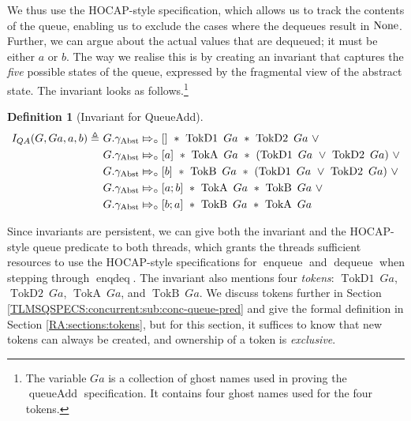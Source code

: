 \documentclass[a4paper, 10pt]{report}
\theoremstyle{definition}
\newtheorem{definition}{Definition}[section]
\newcommand{\enqueue}{\operatorname{enqueue}}
\newcommand{\dequeue}{\operatorname{dequeue}}
\newcommand{\enqdeq}{\operatorname{enqdeq}}
\newcommand{\queueAdd}{\operatorname{queueAdd}}
\newcommand{\QueueAddInvariant}{I_{QA}}
\newcommand{\Qg}{G}
\newcommand{\QAg}{Ga}
\newcommand{\gabst}{\gname_{\mathrm{Abst}}}
\newcommand{\TokDo}[1]{\operatorname{TokD1} ~ #1}
\newcommand{\TokDoQAg}{\TokDo{\QAg}}
\newcommand{\TokDt}[1]{\operatorname{TokD2} ~ #1}
\newcommand{\TokDtQAg}{\TokDt{\QAg}}
\newcommand{\TokA}[1]{\operatorname{TokA} ~ #1}
\newcommand{\TokAQAg}{\TokA{\QAg}}
\newcommand{\TokB}[1]{\operatorname{TokB} ~ #1}
\newcommand{\TokBQAg}{\TokB{\QAg}}
\newcommand{\abstractstatefullfrag}[2]{#1 \Mapsto_{\circ} #2}
\begin{document}
We thus use the HOCAP-style specification, which allows us to track the contents of the queue, enabling us to exclude the cases where the dequeues result in $\operatorname{None}$. Further, we can argue about the actual values that are dequeued; it must be either $a$ or $b$. The way we realise this is by creating an invariant that captures the \textit{five} possible states of the queue, expressed by the fragmental view of the abstract state. The invariant looks as follows.\footnote{The variable $\QAg$ is a collection of ghost names used in proving the $\queueAdd$ specification. It contains four ghost names used for the four tokens.}
\begin{definition}[Invariant for QueueAdd]\label{QueueSpecs:queueadd:invariant}
  \begin{align*}
    \QueueAddInvariant(\Qg, \QAg, a, b) \eqdef~
    &\abstractstatefullfrag{\Qg.\gabst}{[]}~\star~\TokDoQAg~\star~\TokDtQAg~\lor\\
    &\abstractstatefullfrag{\Qg.\gabst}{[a]}~\star~\TokAQAg~\star~(\TokDoQAg~\lor~\TokDtQAg)~\lor\\
    &\abstractstatefullfrag{\Qg.\gabst}{[b]}~\star~\TokBQAg~\star~(\TokDoQAg~\lor~\TokDtQAg)~\lor\\
    &\abstractstatefullfrag{\Qg.\gabst}{[a; b]}~\star~\TokAQAg~\star~\TokBQAg~\lor\\
    &\abstractstatefullfrag{\Qg.\gabst}{[b; a]}~\star~\TokBQAg~\star~\TokAQAg~
  \end{align*}
\end{definition}
Since invariants are persistent, we can give both the invariant and the HOCAP-style queue predicate to both threads, which grants the threads sufficient resources to use the HOCAP-style specifications for $\enqueue$ and $\dequeue$ when stepping through $\enqdeq$. The invariant also mentions four \textit{tokens}: $\TokDoQAg$, $\TokDtQAg$, $\TokAQAg$, and $\TokBQAg$. We discuss tokens further in Section \ref{TLMSQSPECS:concurrent:sub:conc-queue-pred} and give the formal definition in Section \ref{RA:sections:tokens}, but for this section, it suffices to know that new tokens can always be created, and ownership of a token is \textit{exclusive}.\\
\end{document}
